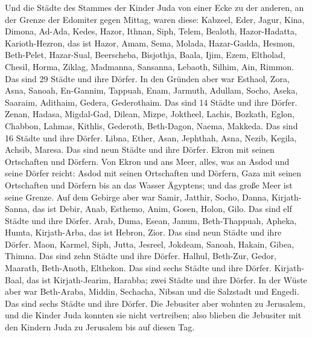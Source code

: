  Und die Städte des Stammes der Kinder Juda von einer
Ecke zu der anderen, an der Grenze der Edomiter gegen Mittag, waren
diese: Kabzeel, Eder, Jagur,  Kina, Dimona, Ad-Ada,
 Kedes, Hazor, Ithnan,  Siph, Telem,
Bealoth,  Hazor-Hadatta, Karioth-Hezron, das ist Hazor,
 Amam, Sema, Molada,  Hazar-Gadda, Hesmon,
Beth-Pelet,  Hazar-Sual, Beerscheba, Bisjothja,
 Baala, Ijim, Ezem,  Eltholad, Chesil,
Horma,  Ziklag, Madmanna, Sansanna, 
Lebaoth, Silhim, Ain, Rimmon. Das sind 29 Städte und ihre Dörfer.
 In den Gründen aber war Esthaol, Zora, Asna,
 Sanoah, En-Gannim, Tappuah, Enam, 
Jarmuth, Adullam, Socho, Aseka,  Saaraim, Adithaim,
Gedera, Gederothaim. Das sind 14 Städte und ihre Dörfer. 
Zenan, Hadasa, Migdal-Gad,  Dilean, Mizpe, Joktheel,
 Lachis, Bozkath, Eglon,  Chabbon, Lahmas,
Kithlis,  Gederoth, Beth-Dagon, Naema, Makkeda. Das sind
16 Städte und ihre Dörfer.  Libna, Ether, Asan,
 Jephthah, Asna, Nezib,  Kegila, Achsib,
Maresa. Das sind neun Städte und ihre Dörfer.  Ekron mit
seinen Ortschaften und Dörfern.  Von Ekron und ans Meer,
alles, was an Asdod und seine Dörfer reicht:  Asdod mit
seinen Ortschaften und Dörfern, Gaza mit seinen Ortschaften und Dörfern
bis an das Wasser Ägyptens; und das große Meer ist seine Grenze.
 Auf dem Gebirge aber war Samir, Jatthir, Socho,
 Danna, Kirjath-Sanna, das ist Debir, 
Anab, Esthemo, Anim,  Gosen, Holon, Gilo. Das sind elf
Städte und ihre Dörfer.  Arab, Duma, Esean,
 Janum, Beth-Thappuah, Apheka,  Humta,
Kirjath-Arba, das ist Hebron, Zior. Das sind neun Städte und ihre
Dörfer.  Maon, Karmel, Siph, Jutta, 
Jesreel, Jokdeam, Sanoah,  Hakain, Gibea, Thimna. Das
sind zehn Städte und ihre Dörfer.  Halhul, Beth-Zur,
Gedor,  Maarath, Beth-Anoth, Elthekon. Das sind sechs
Städte und ihre Dörfer.  Kirjath-Baal, das ist
Kirjath-Jearim, Harabba; zwei Städte und ihre Dörfer.  In
der Wüste aber war Beth-Araba, Middin, Sechacha,  Nibsan
und die Salzstadt und Engedi. Das sind sechs Städte und ihre Dörfer.
 Die Jebusiter aber wohnten zu Jerusalem, und die Kinder
Juda konnten sie nicht vertreiben; also blieben die Jebusiter mit den
Kindern Juda zu Jerusalem bis auf diesen Tag.

